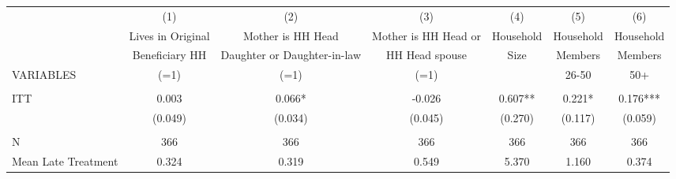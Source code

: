 \begin{tabular}{lcccccc} \hline
 & (1) & (2) & (3) & (4) & (5) & (6) \\
 & Lives in Original & Mother is HH Head & Mother is HH Head or & Household & Household & Household \\
 & Beneficiary HH & Daughter or Daughter-in-law & HH Head spouse & Size & Members & Members \\
VARIABLES & (=1) & (=1) & (=1) &  & 26-50 & 50+ \\ \hline
 &  &  &  &  &  &  \\
ITT & 0.003 & 0.066* & -0.026 & 0.607** & 0.221* & 0.176*** \\
 & (0.049) & (0.034) & (0.045) & (0.270) & (0.117) & (0.059) \\
 &  &  &  &  &  &  \\
N & 366 & 366 & 366 & 366 & 366 & 366 \\
 Mean Late Treatment & 0.324 & 0.319 & 0.549 & 5.370 & 1.160 & 0.374 \\ \hline
\end{tabular}
